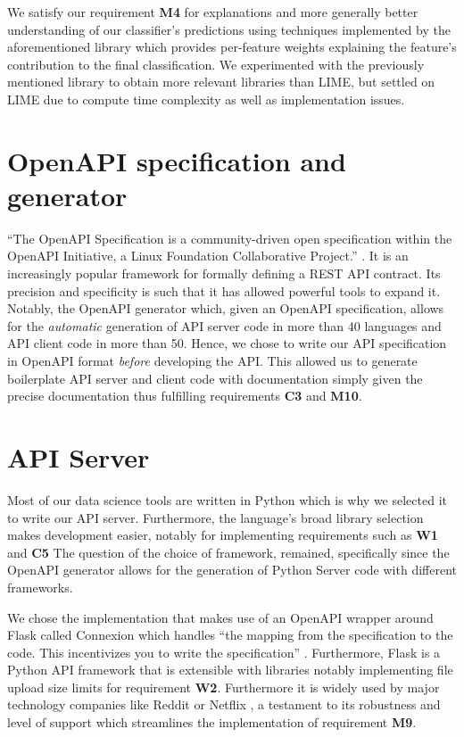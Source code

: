 \documentclass[\version]{l4proj}
\begin{document}
We satisfy our requirement \textbf{M4} for explanations and more generally better understanding of our classifier's predictions using techniques implemented by the aforementioned \textcite{ribeiroMarcotcrLime2020} library \autocite{ribeiroWhyShouldTrust2016} which provides per-feature weights explaining the feature's contribution to the final classification.
We experimented with the previously mentioned \textcite{lundbergSlundbergShap2020} library to obtain more relevant libraries than LIME, but settled on LIME due to compute time complexity as well as implementation issues.

\section{OpenAPI specification and generator}

``The OpenAPI Specification is a community-driven open specification within the OpenAPI Initiative, a Linux Foundation Collaborative Project.'' \autocite{OAIOpenAPISpecification2020}.
It is an increasingly popular framework for formally defining a REST API contract.
Its precision and specificity is such that it has allowed powerful tools to expand it.
Notably, the OpenAPI generator \autocite{OpenAPIToolsOpenapigenerator2020} which, given an OpenAPI specification, allows for the \textit{automatic} generation of API server code in more than 40 languages and API client code in more than 50.
Hence, we chose to write our API specification in OpenAPI format \textit{before} developing the API.
This allowed us to generate boilerplate API server and client code with documentation simply given the precise documentation thus fulfilling requirements \textbf{C3} and \textbf{M10}.

\section{API Server}

Most of our data science tools are written in Python which is why we selected it to write our API server.
Furthermore, the language's broad library selection makes development easier, notably for implementing requirements such as \textbf{W1} and \textbf{C5}
The question of the choice of framework, remained, specifically since the OpenAPI generator allows for the generation of Python Server code with different frameworks.

We chose the implementation that makes use of an OpenAPI wrapper around Flask called Connexion which handles ``the mapping from the specification to the code.
This incentivizes you to write the specification'' \autocite{ZalandoConnexion2020}.
Furthermore, Flask is a Python API framework that is extensible with libraries notably implementing file upload size limits for requirement \textbf{W2}. Furthermore it is widely used by major technology companies like Reddit or Netflix \autocite{WhyDevelopersFlask}, a testament to its robustness and level of support which streamlines the implementation of requirement \textbf{M9}.
\end{document}
